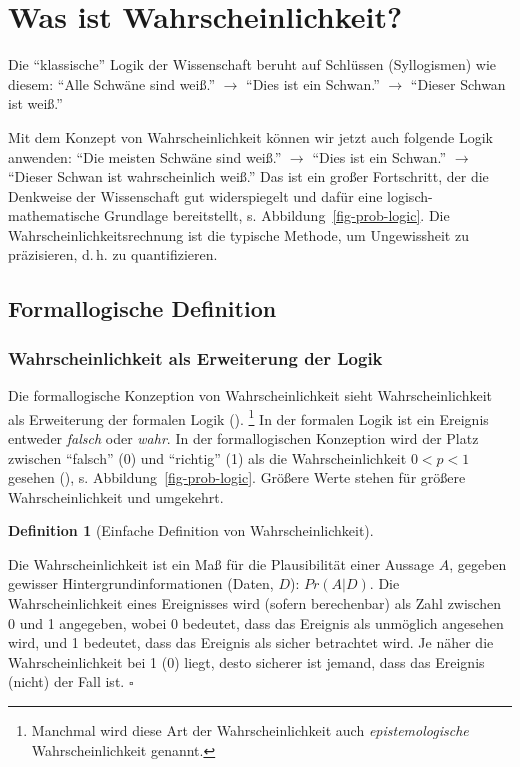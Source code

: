 \documentclass[
  ngerman,
  letterpaper,
  twoside,
  open=any]{scrbook}
\theoremstyle{definition}
\theoremstyle{plain}
\theoremstyle{definition}
\theoremstyle{definition}
\newtheorem{definition}{Definition}[chapter]
\theoremstyle{definition}
\theoremstyle{definition}
\theoremstyle{remark}
\begin{document}
\section{Was ist Wahrscheinlichkeit?}\label{was-ist-wahrscheinlichkeit}

Die \enquote{klassische} Logik der Wissenschaft beruht auf Schlüssen
(Syllogismen) wie diesem: \enquote{Alle Schwäne sind weiß.}
\(\rightarrow\) \enquote{Dies ist ein Schwan.} \(\rightarrow\)
\enquote{Dieser Schwan ist weiß.}

Mit dem Konzept von Wahrscheinlichkeit können wir jetzt auch folgende
Logik anwenden: \enquote{Die meisten Schwäne sind weiß.} \(\rightarrow\)
\enquote{Dies ist ein Schwan.} \(\rightarrow\) \enquote{Dieser Schwan
ist wahrscheinlich weiß.} Das ist ein großer Fortschritt, der die
Denkweise der Wissenschaft gut widerspiegelt und dafür eine
logisch-mathematische Grundlage bereitstellt, s.
Abbildung~\ref{fig-prob-logic}. Die Wahrscheinlichkeitsrechnung ist die
typische Methode, um Ungewissheit zu präzisieren, d.\,h. zu
quantifizieren.

\subsection{Formallogische Definition}\label{formallogische-definition}

\subsubsection{Wahrscheinlichkeit als Erweiterung der
Logik}\label{wahrscheinlichkeit-als-erweiterung-der-logik}

Die formallogische Konzeption von Wahrscheinlichkeit sieht
Wahrscheinlichkeit als Erweiterung der formalen Logik
(). \footnote{Manchmal
  wird diese Art der Wahrscheinlichkeit auch \emph{epistemologische}
  Wahrscheinlichkeit genannt.} In der formalen Logik ist ein Ereignis
entweder \emph{falsch} oder \emph{wahr}. In der formallogischen
Konzeption wird der Platz zwischen \enquote{falsch} (0) und
\enquote{richtig} (1) als die Wahrscheinlichkeit \(0<p<1\) gesehen
(), s.
Abbildung~\ref{fig-prob-logic}. Größere Werte stehen für größere
Wahrscheinlichkeit und umgekehrt.

\begin{definition}[Einfache Definition von
Wahrscheinlichkeit]\protect\hypertarget{def-wskt}{}\label{def-wskt}

Die Wahrscheinlichkeit ist ein Maß für die Plausibilität einer Aussage
\(A\), gegeben gewisser Hintergrundinformationen (Daten, \(D\)):
\(Pr(A|D)\). Die Wahrscheinlichkeit eines Ereignisses wird (sofern
berechenbar) als Zahl zwischen 0 und 1 angegeben, wobei 0 bedeutet, dass
das Ereignis als unmöglich angesehen wird, und 1 bedeutet, dass das
Ereignis als sicher betrachtet wird. Je näher die Wahrscheinlichkeit bei
1 (0) liegt, desto sicherer ist jemand, dass das Ereignis (nicht) der
Fall ist. \(\square\)

\end{definition}
\end{document}
